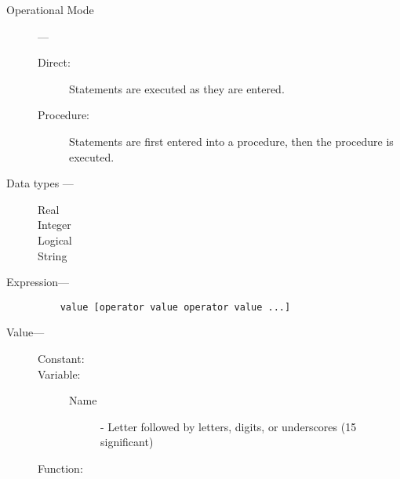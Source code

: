 \begin{description}

\item [Operational Mode] ---

\begin{description}
\item [Direct:] \mbox{}

Statements are executed as they are entered.

\item [Procedure:] \mbox{}

Statements are first entered into a procedure, then the procedure is
executed.
\end{description}

\item [Data types ---]

\begin{description}
\item[Real]
\item[Integer]
\item[Logical]
\item[String]
\end{description}

\item [Expression--- ]

\begin{verbatim}
    value [operator value operator value ...]
\end{verbatim}

\item [Value--- ]

\begin{description}
\item [Constant:] \mbox{}
\item [Variable:] \mbox{}
\begin{description}
\item[Name] - Letter followed by letters, digits, or underscores (15 significant)
\end{description}
\item [Function:] \mbox{}


\end{description}
\end{description}
